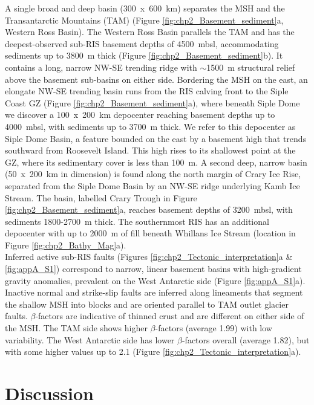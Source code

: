 A single broad and deep basin (300~x~600~km) separates the MSH and the Transantarctic Mountains (TAM) (Figure \ref{fig:chp2_Basement_sediment}a, Western Ross Basin). The Western Ross Basin parallels the TAM and has the deepest-observed sub-RIS basement depths of 4500~mbsl, accommodating sediments up to 3800~m thick (Figure \ref{fig:chp2_Basement_sediment}b). It contains a long, narrow NW-SE trending ridge with $\sim$1500~m structural relief above the basement sub-basins on either side. Bordering the MSH on the east, an elongate NW-SE trending basin runs from the RIS calving front to the Siple Coast GZ (Figure \ref{fig:chp2_Basement_sediment}a), where beneath Siple Dome we discover a 100~x~200~km depocenter reaching basement depths up to 4000~mbsl, with sediments up to 3700~m thick. We refer to this depocenter as Siple Dome Basin, a feature bounded on the east by a basement high that trends southward from Roosevelt Island. This high rises to its shallowest point at the GZ, where its sedimentary cover is less than 100~m. A second deep, narrow basin (50~x~200~km in dimension) is found along the north margin of Crary Ice Rise, separated from the Siple Dome Basin by an NW-SE ridge underlying Kamb Ice Stream. The basin, labelled Crary Trough in Figure \ref{fig:chp2_Basement_sediment}a, reaches basement depths of 3200~mbsl, with sediments 1800-2700~m thick. The southernmost RIS has an additional depocenter with up to 2000~m of fill beneath Whillans Ice Stream (location in Figure \ref{fig:chp2_Bathy_Mag}a).\\

Inferred active sub-RIS faults (Figures \ref{fig:chp2_Tectonic_interpretation}a \& \ref{fig:appA_S1}) correspond to narrow, linear basement basins with high-gradient gravity anomalies, prevalent on the West Antarctic side (Figure \ref{fig:appA_S1}a). Inactive normal and strike-slip faults are inferred along lineaments that segment the shallow MSH into blocks and are oriented parallel to TAM outlet glacier faults. $\beta$-factors are indicative of thinned crust and are different on either side of the MSH. The TAM side shows higher $\beta$-factors (average 1.99) with low variability. The West Antarctic side has lower $\beta$-factors overall (average 1.82), but with some higher values up to 2.1 (Figure \ref{fig:chp2_Tectonic_interpretation}a). 



\section{Discussion}

